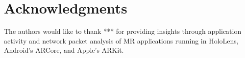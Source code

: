 
\section*{Acknowledgments}  The authors would like to thank *** for providing insights through application activity and network packet analysis of MR applications running in HoloLens, Android's ARCore, and Apple's ARKit.
%

